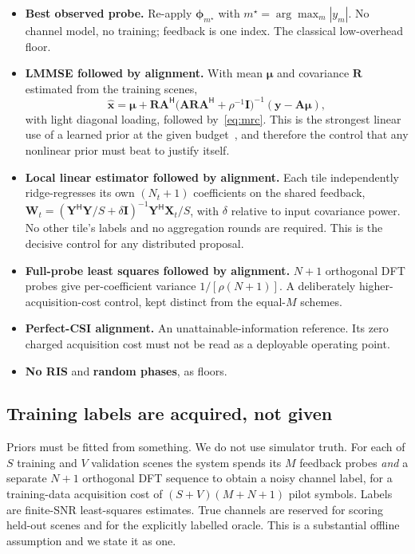 \documentclass[journal]{IEEEtran}
\begin{document}
\begin{itemize}
\item \textbf{Best observed probe.} Re-apply $\bm{\phi}_{m^\star}$ with $m^\star=\arg\max_m|y_m|$. No channel model, no training; feedback is one index. The classical low-overhead floor.
\item \textbf{LMMSE followed by alignment.} With mean $\bm{\mu}$ and covariance $\bm{R}$ estimated from the training scenes,
\begin{equation}
\hat{\bm{x}} = \bm{\mu} + \bm{R}\bm{A}^{\mathsf{H}}\bigl(\bm{A}\bm{R}\bm{A}^{\mathsf{H}} + \rho^{-1}\bm{I}\bigr)^{-1}(\bm{y}-\bm{A}\bm{\mu}),
\label{eq:lmmse}
\end{equation}
with light diagonal loading, followed by~\eqref{eq:mrc}. This is the strongest linear use of a learned prior at the given budget~\cite{kay1993}, and therefore the control that any nonlinear prior must beat to justify itself.
\item \textbf{Local linear estimator followed by alignment.} Each tile independently ridge-regresses its own $(N_t{+}1)$ coefficients on the shared feedback, $\bm{W}_t=(\bm{Y}^{\mathsf{H}}\bm{Y}/S+\delta\bm{I})^{-1}\bm{Y}^{\mathsf{H}}\bm{X}_t/S$, with $\delta$ relative to input covariance power. No other tile's labels and no aggregation rounds are required. This is the decisive control for any distributed proposal.
\item \textbf{Full-probe least squares followed by alignment.} $N+1$ orthogonal DFT probes give per-coefficient variance $1/[\rho(N{+}1)]$. A deliberately higher-acquisition-cost control, kept distinct from the equal-$M$ schemes.
\item \textbf{Perfect-CSI alignment.} An unattainable-information reference. Its zero charged acquisition cost must not be read as a deployable operating point.
\item \textbf{No RIS} and \textbf{random phases}, as floors.
\end{itemize}

\subsection{Training labels are acquired, not given}
Priors must be fitted from something. We do not use simulator truth. For each of $S$ training and $V$ validation scenes the system spends its $M$ feedback probes \emph{and} a separate $N+1$ orthogonal DFT sequence to obtain a noisy channel label, for a training-data acquisition cost of $(S+V)(M+N+1)$ pilot symbols. Labels are finite-SNR least-squares estimates. True channels are reserved for scoring held-out scenes and for the explicitly labelled oracle. This is a substantial offline assumption and we state it as one.
\end{document}

